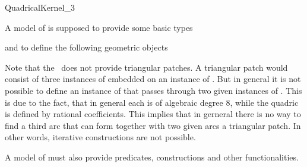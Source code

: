 \begin{ccRefConcept}{QuadricalKernel_3}



\ccTypes

A model of  is supposed to provide some basic types

\ccGlue
{}





and to define the following geometric objects

\ccGlue
{}
\ccGlue
{}
\ccGlue
{}

Note that the \ccRefName\ does not provide triangular patches. 
A triangular patch would consist of three instances of 
 embedded on an instance of .
But in general it is not possible to define an instance of  
that 
passes through two given instances of . 
This is due to the fact, that in general each  is of 
algebraic degree 8, while the quadric is defined by rational coefficients. 
This implies that in gerneral there is no way to find a third arc that can 
form together with two given arcs a triangular patch. 
In other words, iterative constructions are not possible. 

A model of  must also provide predicates, 
constructions and other functionalities. 


\end{ccRefConcept}
